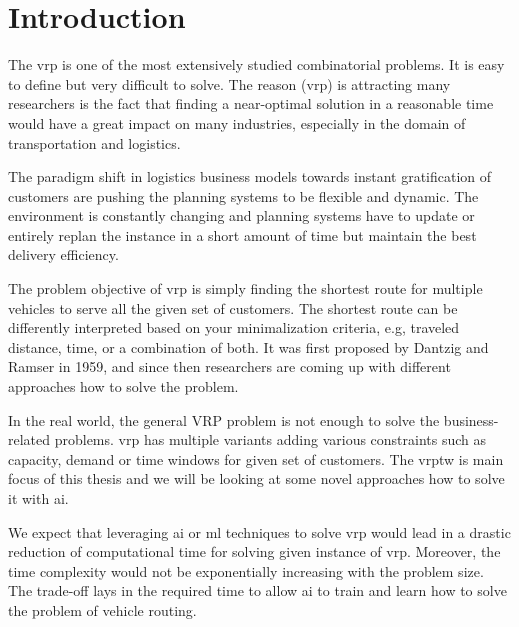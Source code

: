 \chapter{Introduction}
    The \gls{vrp} is one of the most extensively studied combinatorial problems. It is easy to define but very difficult to solve\cite{time-complexity-vrp}. The reason (\gls{vrp}) is attracting many researchers is the fact that finding a near-optimal solution in a reasonable time would have a great impact on many industries, especially in the domain of transportation and logistics. 
    
    The paradigm shift in logistics business models towards instant gratification of customers are pushing the planning systems to be flexible and dynamic. The environment is constantly changing and planning systems have to update or entirely replan the instance in a short amount of time but maintain the best delivery efficiency.
    
    The problem objective of \gls{vrp} is simply finding the shortest route for multiple vehicles to serve all the given set of customers. The shortest route can be differently interpreted based on your minimalization criteria, e.g, traveled distance, time, or a combination of both. It was first proposed by Dantzig and Ramser \cite{truck-dispatching-problem} in 1959, and since then researchers are coming up with different approaches how to solve the problem. 

    In the real world, the general VRP problem is not enough to solve the business-related problems. \gls{vrp} has multiple variants adding various constraints such as capacity, demand or time windows for given set of customers. The \gls{vrptw} is main focus of this thesis and we will be looking at some novel approaches how to solve it with \gls{ai}.
    
    We expect that leveraging \gls{ai} or \gls{ml} techniques to solve \gls{vrp} would lead in a drastic reduction of computational time for solving given instance of \gls{vrp}. Moreover, the time complexity would not be exponentially increasing with the problem size. The trade-off lays in the required time to allow \gls{ai} to train and learn how to solve the problem of vehicle routing.
    
